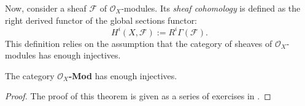 Now, consider a sheaf $\mathscr{F}$ of $\mathscr{O}_{X}$-modules.
Its \emph{sheaf cohomology} is defined as the right derived functor of
the global sections functor:
\[
  H^{i}(X, \mathscr{F}) := R^{i}\Gamma\left(\mathscr{F}\right).
\]
This definition relies on the assumption that the category of sheaves of
$\mathscr{O}_{X}$-modules has enough injectives.
\begin{thm}\label{thm:enough_injectives}
  The category $\mathscr{O}_{X}$\textup{\textbf{-Mod}} has enough injectives.
\end{thm}
\begin{proof}
  The proof of this theorem is given as a series of exercises in
  \cite{vakil}.
\end{proof}

